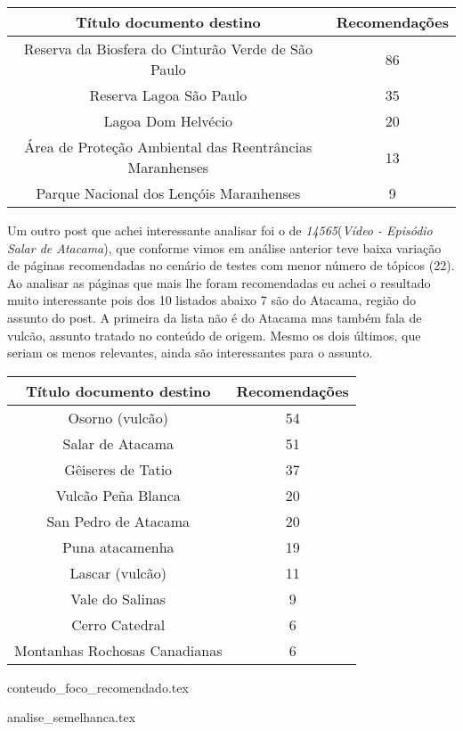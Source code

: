 \begin{center}
    \begin{tabular}{|c|c|}
        \hline
        \textbf{Título documento destino} & \textbf{Recomendações} \\
        \hline
        Reserva da Biosfera do Cinturão Verde de São Paulo & 86 \\
        \hline
        Reserva Lagoa São Paulo & 35 \\
        \hline
        Lagoa Dom Helvécio & 20 \\
        \hline
        Área de Proteção Ambiental das Reentrâncias Maranhenses & 13 \\
        \hline
        Parque Nacional dos Lençóis Maranhenses & 9 \\
        \hline
    \end{tabular}
\end{center}

Um outro post que achei interessante analisar foi o de \textit{14565}(\textit{Vídeo - Episódio Salar de Atacama}), que conforme vimos em análise 
anterior teve baixa variação de páginas recomendadas no cenário de testes com menor número de tópicos (22). Ao analisar as páginas que mais lhe foram
recomendadas eu achei o resultado muito interessante pois dos 10 listados abaixo 7 são do Atacama, região do assunto do post. A primeira da lista
não é do Atacama mas também fala de vulcão, assunto tratado no conteúdo de origem. Mesmo os dois últimos, que seriam os menos relevantes, ainda 
são interessantes para o assunto.

\begin{center}
    \begin{tabular}{|c|c|}
        \hline
        \textbf{Título documento destino} & \textbf{Recomendações} \\
        \hline
        Osorno (vulcão) & 54 \\
        \hline
        Salar de Atacama & 51 \\
        \hline
        Gêiseres de Tatio & 37 \\
        \hline
        Vulcão Peña Blanca & 20 \\
        \hline
        San Pedro de Atacama & 20 \\
        \hline
        Puna atacamenha & 19 \\
        \hline
        Lascar (vulcão) & 11 \\
        \hline
        Vale do Salinas & 9 \\
        \hline
        Cerro Catedral & 6 \\
        \hline
        Montanhas Rochosas Canadianas & 6 \\
        \hline
    \end{tabular}
\end{center}

{conteudo_foco_recomendado.tex}

{analise_semelhanca.tex}